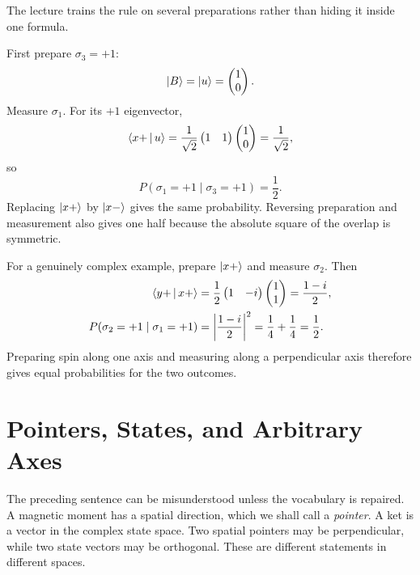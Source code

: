 The lecture trains the rule on several preparations rather than hiding it inside one formula.

First prepare \(\sigma_3=+1\):
\begin{equation}
  \left\lvert B\right\rangle=\left\lvert u\right\rangle=\begin{pmatrix}1\\0\end{pmatrix}.
\end{equation}
Measure \(\sigma_1\). For its \(+1\) eigenvector,
\begin{equation}
  \left\langle x+\,\middle|\,u\right\rangle
  =
  \frac{1}{\sqrt2}
  \begin{pmatrix}1&1\end{pmatrix}
  \begin{pmatrix}1\\0\end{pmatrix}
  =\frac{1}{\sqrt2},
\end{equation}
so
\begin{equation}
  P(\sigma_1=+1\mid\sigma_3=+1)=\frac12.
\end{equation}
Replacing \(\left\lvert x+\right\rangle\) by \(\left\lvert x-\right\rangle\) gives the same probability. Reversing preparation and measurement also gives one half because the absolute square of the overlap is symmetric.

For a genuinely complex example, prepare \(\left\lvert x+\right\rangle\) and measure \(\sigma_2\). Then
\begin{align}
  \left\langle y+\,\middle|\,x+\right\rangle
  &=
  \frac12
  \begin{pmatrix}1&-i\end{pmatrix}
  \begin{pmatrix}1\\1\end{pmatrix}
  =\frac{1-i}{2},
  \notag\\
  P(\sigma_2=+1\mid\sigma_1=+1)
  &=\left|\frac{1-i}{2}\right|^2
  =\frac14+\frac14
  =\frac12.
  \label{eq:l03-complex-probability-example}
\end{align}
Preparing spin along one axis and measuring along a perpendicular axis therefore gives equal probabilities for the two outcomes.

\section{Pointers, States, and Arbitrary Axes}

The preceding sentence can be misunderstood unless the vocabulary is repaired. A magnetic moment has a spatial direction, which we shall call a \emph{pointer}. A ket is a vector in the complex state space. Two spatial pointers may be perpendicular, while two state vectors may be orthogonal. These are different statements in different spaces.

